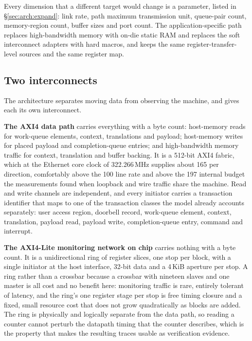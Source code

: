 Every dimension that a different target would change is a parameter, listed in
\S\ref{sec:arch:expand}: link rate, path maximum transmission unit, queue-pair
count, memory-region count, buffer sizes and port count. The application-specific
path replaces high-bandwidth memory with on-die static RAM and replaces the
soft interconnect adapters with hard macros, and keeps the same
register-transfer-level sources and the same register map.

\subsection{Two interconnects}
\label{sec:arch:interconnect}

The architecture separates moving data from observing the machine, and gives
each its own interconnect.

\textbf{The AXI4 data path} carries everything with a byte count: host-memory
reads for work-queue elements, context, translations and payload; host-memory
writes for placed payload and completion-queue entries; and high-bandwidth
memory traffic for context, translation and buffer backing. It is a
512-bit AXI4 fabric, which at the Ethernet core clock of 322.266\,MHz supplies
about 165\Gbps{} per direction, comfortably above the 100\Gbps{} line rate and
above the 197\Gbps{} internal budget the measurements found when loopback and
wire traffic share the machine. Read and write channels are independent, and
every initiator carries a transaction identifier that maps to one of the
transaction classes the model already accounts separately: user access region,
doorbell record, work-queue element, context, translation, payload read,
payload write, completion-queue entry, command and interrupt.

\textbf{The AXI4-Lite monitoring network on chip} carries nothing with a byte
count. It is a unidirectional ring of register slices, one stop per block, with
a single initiator at the host interface, 32-bit data and a 4\,KiB aperture per
stop. A ring rather than a crossbar because a crossbar with nineteen slaves and
one master is all cost and no benefit here: monitoring traffic is rare, entirely
tolerant of latency, and the ring's one register stage per stop is free timing
closure and a fixed, small resource cost that does not grow quadratically as
blocks are added. The ring is physically and logically separate from the data
path, so reading a counter cannot perturb the datapath timing that the counter
describes, which is the property that makes the resulting traces usable as
verification evidence.

